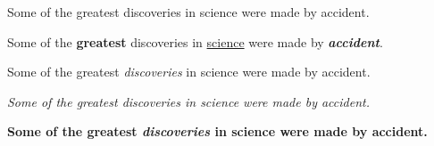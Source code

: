 \documentclass[12pt, letterpaper]{article}
\begin{document}
Some of the greatest discoveries in science were made by accident.

Some of the \textbf{greatest} discoveries in \underline{science} were made by \textbf{\textit{accident}}.

Some of the greatest \emph{discoveries} in science were made by accident.

\textit{Some of the greatest \emph{discoveries} in science were made by accident.}

\textbf{Some of the greatest \emph{discoveries} in science were made by accident.}
\end{document}

